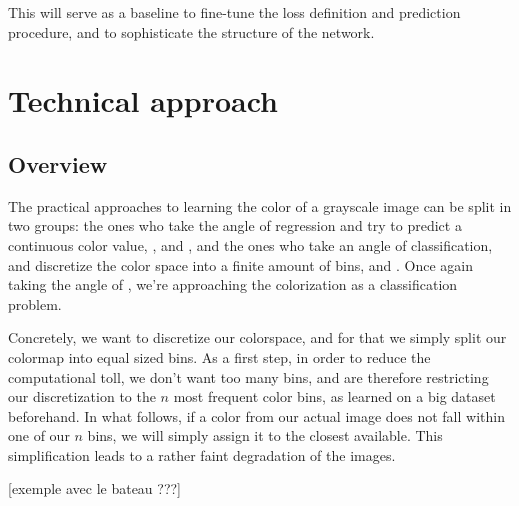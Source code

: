 \documentclass[10pt,twocolumn,letterpaper]{article}
\begin{document}
This will serve as a baseline to fine-tune the loss definition and prediction procedure, and to sophisticate the structure of the network.

\section{Technical approach}

\subsection{Overview}


The practical approaches to learning the color of a grayscale image can be split in two groups: the ones who take the angle of regression and try to predict a continuous color value, \eg \cite{cheng2015deep}, \cite{dahl2016tinyclouds} and \cite{deshpande2015learning}, and the ones who take an angle of classification, and discretize the color space into a finite amount of bins, \eg \cite{charpiat2008automatic} and \cite{zhang2016colorful}. Once again taking the angle of \cite{zhang2016colorful}, we're approaching the colorization as a classification problem.

Concretely, we want to discretize our colorspace, and for that we simply split our colormap into equal sized bins. As a first step, in order to reduce the computational toll, we don't want too many bins, and are therefore restricting our discretization to the $n$ most frequent color bins, as learned on a big dataset beforehand. In what follows, if a color from our actual image does not fall within one of our $n$ bins, we will simply assign it to the closest available. This simplification leads to a rather faint degradation of the images.

[exemple avec le bateau ???]
\end{document}

